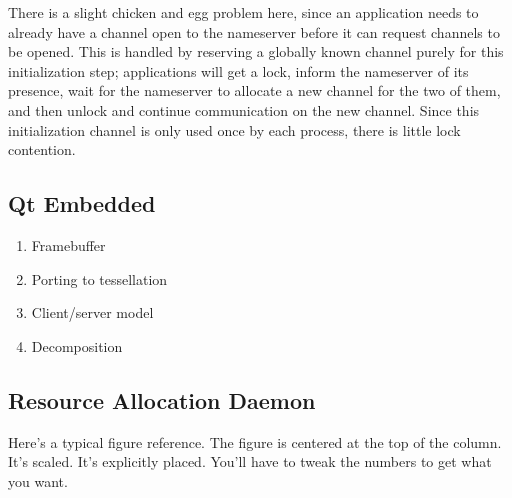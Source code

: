 \documentclass[letterpaper,twocolumn,10pt]{article}
\begin{document}
There is a slight chicken and egg problem here, since an application needs to already have a channel open to the nameserver before it can request channels to be opened. This is handled by reserving a globally known channel purely for this initialization step; applications will get a lock, inform the nameserver of its presence, wait for the nameserver to allocate a new channel for the two of them, and then unlock and continue communication on the new channel. Since this initialization channel is only used once by each process, there is little lock contention.

\subsection{Qt Embedded}
\begin{enumerate}
\item Framebuffer
\item Porting to tessellation
\item Client/server model
\item Decomposition
\end{enumerate}

\subsection{Resource Allocation Daemon}

Here's a typical figure reference.  The figure is centered at the
top of the column.  It's scaled.  It's explicitly placed.  You'll
have to tweak the numbers to get what you want.\\
\end{document}
